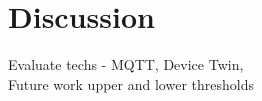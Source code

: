 \section{Discussion} \label{sec:discussion}
Evaluate techs - MQTT, Device Twin, 
\\Future work upper and lower thresholds





